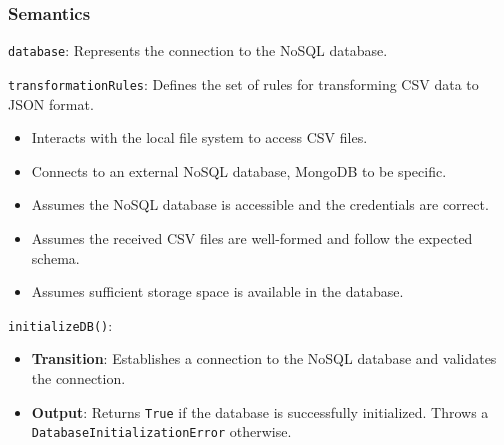 \documentclass[12pt, titlepage]{article}
\begin{document}
\subsubsection{Semantics}
\begin{description}
  \item[State Variables:]
  \item
  \texttt{database}: Represents the connection to the NoSQL database.
  \item
  \texttt{transformationRules}: Defines the set of rules for transforming CSV data to
  JSON format.
  \item[Environment Variables:]
  \item
  \begin{itemize}
    \item Interacts with the local file system to access CSV files.
  \end{itemize}
  \item 
  \begin{itemize}
    \item Connects to an external NoSQL database, MongoDB to be specific.
  \end{itemize}
  \item 

  \item[Assumptions:]
  \item
  \begin{itemize}
    \item Assumes the NoSQL database is accessible and the credentials are correct.
  \end{itemize}
  \item
  \begin{itemize}
    \item Assumes the received CSV files are well-formed and follow the expected schema.
  \end{itemize}
  \item 
  \begin{itemize}
    \item Assumes sufficient storage space is available in the database.
  \end{itemize}
  \item 

  \item[Access Routine Semantics:] 
  \item
  \texttt{initializeDB()}:
  \item
  \begin{itemize}
    \item \textbf{Transition}: Establishes a connection to the NoSQL database and validates
    the connection.
  \end{itemize}
  \item
  \begin{itemize}
    \item \textbf{Output}: Returns \texttt{True} if the database is successfully initialized.
    Throws a\\ \texttt{DatabaseInitializationError} otherwise.
  \end{itemize}
  \item 


\end{description}
\end{document}
